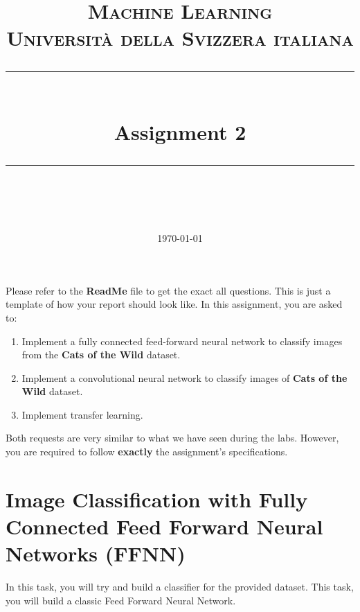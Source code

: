 \documentclass[11pt]{scrartcl}
\title{	
	\normalfont\normalsize
	\textsc{Machine Learning\\%
	Universit\`a della Svizzera italiana}\\
	\vspace{25pt}
	\rule{\linewidth}{0.5pt}\\
	\vspace{20pt}
	{\huge Assignment 2}\\
	\vspace{12pt}
	\rule{\linewidth}{1pt}\\
	\vspace{12pt}
}
\author{\LARGE \thestudent}
\date{\normalsize\today}
\begin{document}
\maketitle

Please refer to the \textbf{ReadMe} file to get the exact all questions. 
This is just a template of how your report should look like.
In this assignment, you are asked to:

\begin{enumerate}
\item Implement a fully connected feed-forward neural network to classify images 
from the \textbf{Cats of the Wild} dataset.

\item Implement a convolutional neural network to classify images of 
\textbf{Cats of the Wild} dataset.

\item Implement transfer learning.
\end{enumerate}


Both requests are very similar to what we have seen during the labs. 
However, you are required to follow \textbf{exactly} the assignment's specifications.

\section{Image Classification with Fully Connected Feed Forward Neural Networks (FFNN)}

In this task, you will try and build a classifier for the provided dataset. 
This task, you will build a classic Feed Forward Neural Network.
\end{document}
